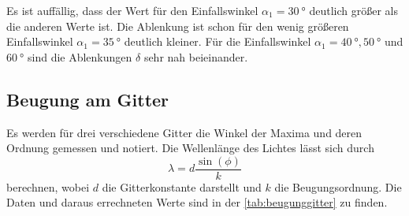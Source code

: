   \noindent Es ist auffällig, dass der Wert für den Einfallswinkel $\alpha_1 = \SI{30}{\degree}$ deutlich größer als die anderen Werte ist. Die Ablenkung ist schon 
  für den wenig größeren Einfallswinkel $\alpha_1 = \SI{35}{\degree}$ deutlich kleiner. Für die Einfallswinkel $\alpha_1 = \SI{40}{\degree}, \SI{50}{\degree}$ und 
  $\SI{60}{\degree}$ sind die Ablenkungen $\delta$ sehr nah beieinander. 

\subsection{Beugung am Gitter}

  Es werden für drei verschiedene Gitter die Winkel der Maxima und deren Ordnung gemessen und notiert. Die Wellenlänge des Lichtes lässt sich durch
  \begin{equation*}
    \lambda = d \frac{\sin(\phi)}{k}
  \end{equation*}
  berechnen, wobei $d$ die Gitterkonstante darstellt und $k$ die Beugungsordnung. Die Daten und daraus errechneten Werte sind in der \autoref{tab:beugunggitter} 
  zu finden.

